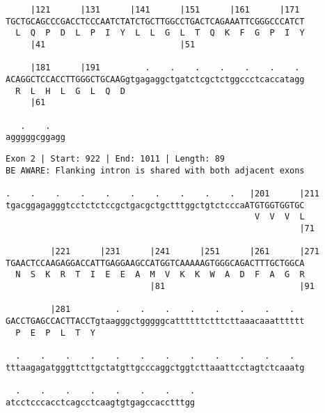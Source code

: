 \documentclass{article}
\begin{document}
\begin{Verbatim}
     |121      |131      |141      |151      |161      |171 
TGCTGCAGCCCGACCTCCCAATCTATCTGCTTGGCCTGACTCAGAAATTCGGGCCCATCT
  L  Q  P  D  L  P  I  Y  L  L  G  L  T  Q  K  F  G  P  I  Y
     |41                           |51                      
  
     |181      |191         .    .    .    .    .    .    . 
ACAGGCTCCACCTTGGGCTGCAAGgtgagaggctgatctcgctctggccctcaccatagg
  R  L  H  L  G  L  Q  D                                    
     |61                                                    
  
   .    .   
agggggcggagg
\end{Verbatim}
\newpage
\begin{Verbatim}
Exon 2 | Start: 922 | End: 1011 | Length: 89
BE AWARE: Flanking intron is shared with both adjacent exons
 
.    .    .    .    .    .    .    .    .    .   |201      |211
tgacggagagggtcctctctccgctgacgctgctttggctgtctcccaATGTGGTGGTGC
                                                  V  V  V  L
                                                           |71
  
         |221      |231      |241      |251      |261      |271
TGAACTCCAAGAGGACCATTGAGGAAGCCATGGTCAAAAAGTGGGCAGACTTTGCTGGCA
  N  S  K  R  T  I  E  E  A  M  V  K  K  W  A  D  F  A  G  R
                             |81                           |91
  
         |281         .    .    .    .    .    .    .    .  
GACCTGAGCCACTTACCTgtaagggctgggggcattttttctttcttaaacaaatttttt
  P  E  P  L  T  Y                                          
  
  .    .    .    .    .    .    .    .    .    .    .    .  
tttaagagatgggttcttgctatgttgcccaggctggtcttaaattcctagtctcaaatg
  
  .    .    .    .    .    .    .    .
atcctcccacctcagcctcaagtgtgagccacctttgg
\end{Verbatim}
\newpage
\end{document}
